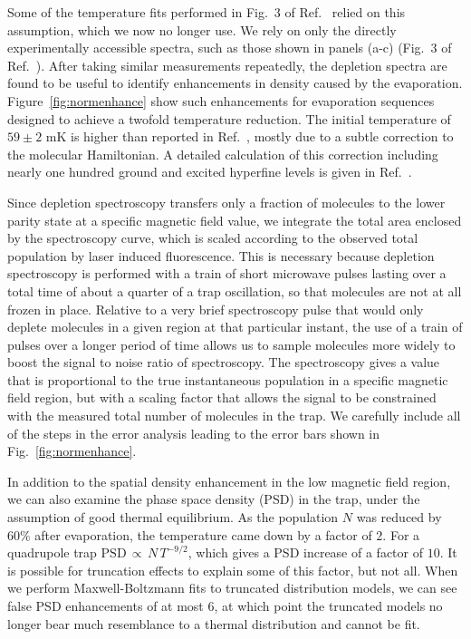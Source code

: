 \documentclass[%
 reprint,
 amsmath,amssymb,
 aps,
prl,
]{revtex4-1}
\begin{document}
Some of the temperature fits performed in Fig.~3 of Ref.~\cite{Stuhl2012evap} relied on this assumption, which we now no longer use. We rely on only the directly experimentally accessible spectra, such as those shown in panels (a-c) (Fig.~3 of Ref.~\cite{Stuhl2012evap}). After taking similar measurements repeatedly, the depletion spectra are found to be useful to identify enhancements in density caused by the evaporation. Figure~\ref{fig:normenhance} show such enhancements for evaporation sequences designed to achieve a twofold temperature reduction. The initial temperature of $59\pm2\text{ mK}$ is higher than reported in Ref.~\cite{Stuhl2012evap}, mostly due to a subtle correction to the molecular Hamiltonian.  A detailed calculation of this correction including nearly one hundred ground and excited hyperfine levels is given in Ref.~\cite{Maeda2015}.

Since depletion spectroscopy transfers only a fraction of molecules to the lower parity state at a specific magnetic field value, we integrate the total area enclosed by the spectroscopy curve, which is scaled according to the observed total population by laser induced fluorescence.  
This is necessary because depletion spectroscopy is performed with a train of short microwave pulses lasting over a total time of about a quarter of a trap oscillation, so that molecules are not at all frozen in place. 
Relative to a very brief spectroscopy pulse that would only deplete molecules in a given region at that particular instant, the use of a train of pulses over a longer period of time allows us to sample molecules more widely to boost the signal to noise ratio of spectroscopy. 
The spectroscopy gives a value that is proportional to the true instantaneous population in a specific magnetic field region, but with a scaling factor that allows the signal to be constrained with the measured total number of molecules in the trap. 
We carefully include all of the steps in the error analysis leading to the error bars shown in Fig.~\ref{fig:normenhance}.

In addition to the spatial density enhancement in the low magnetic field region, we can also examine the phase space density (PSD) in the trap, under the assumption of good thermal equilibrium. 
As the population $N$ was reduced by $60\%$ after evaporation, the temperature came down by a factor of $2$. 
For a quadrupole trap $\text{PSD}\,{\propto}\,N\,T^{-9/2}$, which gives a PSD increase of a factor of $10$. 
It is possible for truncation effects to explain some of this factor, but not all.
When we perform Maxwell-Boltzmann fits to truncated distribution models, we can see false PSD enhancements of at most $6$, at which point the truncated models no longer bear much resemblance to a thermal distribution and cannot be fit.
\end{document}
